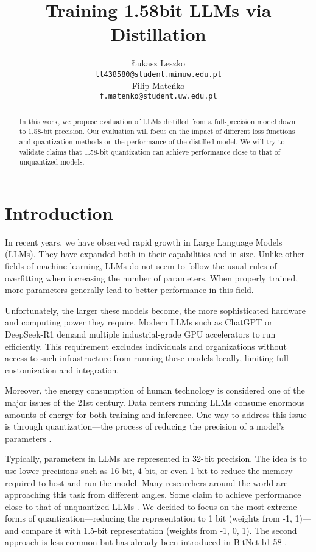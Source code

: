 \documentclass{article}
\title{Training 1.58bit LLMs via Distillation}
\author{Łukasz Leszko \\
	\texttt{ll438580@student.mimuw.edu.pl} \\
	\And
	Filip Mateńko \\
	\texttt{f.matenko@student.uw.edu.pl} \\
}
\begin{document}
\maketitle

\begin{abstract}
	In this work, we propose evaluation of LLMs distilled from a full-precision model down to 1.58-bit precision. Our evaluation will focus on the impact of different loss functions and quantization methods on the performance of the distilled model. We will try to validate claims that 1.58-bit quantization can achieve performance close to that of unquantized models.
\end{abstract}




\section{Introduction}
In recent years, we have observed rapid growth in Large Language Models (LLMs). They have expanded both in their capabilities and in size. 
Unlike other fields of machine learning, LLMs do not seem to follow the usual rules of overfitting when increasing the number of 
parameters. When properly trained, more parameters generally lead to better performance in this field. 

Unfortunately, the larger these models become, the more sophisticated hardware and computing power they require. Modern LLMs such as 
ChatGPT or DeepSeek-R1 demand multiple industrial-grade GPU accelerators to run efficiently. This requirement excludes individuals and 
organizations without access to such infrastructure from running these models locally, limiting full customization and integration.

Moreover, the energy consumption of human technology is considered one of the major issues of the 21st century. Data centers running LLMs 
consume enormous amounts of energy for both training and inference. One way to address this issue is through quantization—the process of 
reducing the precision of a model’s parameters \cite{xiao2024smoothquantaccurateefficientposttraining}.

Typically, parameters in LLMs are represented in 32-bit precision. The idea is to use lower precisions such as 16-bit, 4-bit, 
or even 1-bit to reduce the memory required to host and run the model. Many researchers around the world are approaching this task from 
different angles. Some claim to achieve performance close to that of unquantized LLMs \cite{wang2023bitnetscaling1bittransformers}. We 
decided to focus on the most extreme forms of quantization—reducing the representation to 1 bit (weights from {-1, 1})—and compare it
with 1.5-bit representation (weights from {-1, 0, 1}). The second approach is less common but has already been introduced in BitNet 
b1.58 \cite{ma2024era1bitllmslarge}.
\end{document}
